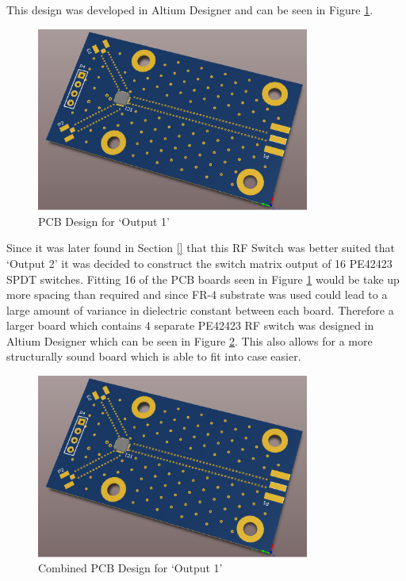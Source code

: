 \documentclass[12pt,openany,a4paper]{book}
\begin{document}
This design was developed in Altium Designer and can be seen in Figure \ref{fig:output1}.
\begin{figure}[H]
	\centering
    \includegraphics[width=0.8\textwidth]{output1_pcb.png}
	\caption{PCB Design for `Output 1'}
	\label{fig:output1}
\end{figure} 
Since it was later found in Section \ref{} that this RF Switch was better suited that `Output 2' it was decided to construct the switch matrix output of 16 PE42423 SPDT switches. Fitting 16 of the PCB boards seen in Figure \ref{fig:output1} would be take up more spacing than required and since FR-4 substrate was used could lead to a large amount of variance in dielectric constant between each board. Therefore a larger board which contains $4$ separate PE42423 RF switch was designed in Altium Designer which can be seen in Figure \ref{fig:output1-large}. This also allows for a more structurally sound board which is able to fit into case easier.
\begin{figure}[H]
	\centering
    \includegraphics[width=0.8\textwidth]{output1_pcb.png}
	\caption{Combined PCB Design for `Output 1'}
	\label{fig:output1-large}
\end{figure} 
\end{document}
